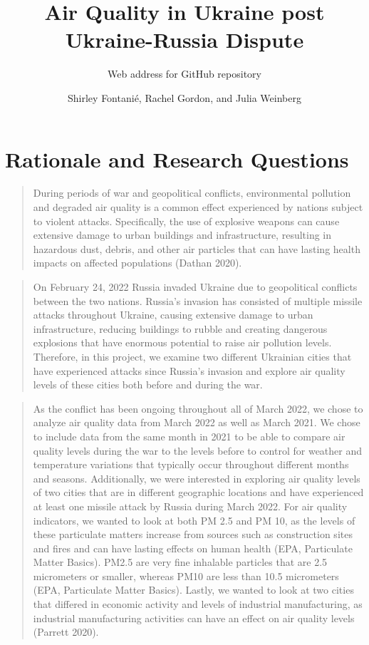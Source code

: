\documentclass[
  12pt,
]{article}
\title{Air Quality in Ukraine post Ukraine-Russia Dispute}
\subtitle{Web address for GitHub repository}
\author{Shirley Fontanié, Rachel Gordon, and Julia Weinberg}
\date{}
\begin{document}
\maketitle

\newpage
\tableofcontents
\newpage
\listoftables 
\newpage 
\listoffigures 
\newpage

\hypertarget{rationale-and-research-questions}{%
\section{Rationale and Research
Questions}\label{rationale-and-research-questions}}

\begin{quote}
During periods of war and geopolitical conflicts, environmental
pollution and degraded air quality is a common effect experienced by
nations subject to violent attacks. Specifically, the use of explosive
weapons can cause extensive damage to urban buildings and
infrastructure, resulting in hazardous dust, debris, and other air
particles that can have lasting health impacts on affected populations
(Dathan 2020).
\end{quote}

\begin{quote}
On February 24, 2022 Russia invaded Ukraine due to geopolitical
conflicts between the two nations. Russia's invasion has consisted of
multiple missile attacks throughout Ukraine, causing extensive damage to
urban infrastructure, reducing buildings to rubble and creating
dangerous explosions that have enormous potential to raise air pollution
levels. Therefore, in this project, we examine two different Ukrainian
cities that have experienced attacks since Russia's invasion and explore
air quality levels of these cities both before and during the war.
\end{quote}

\begin{quote}
As the conflict has been ongoing throughout all of March 2022, we chose
to analyze air quality data from March 2022 as well as March 2021. We
chose to include data from the same month in 2021 to be able to compare
air quality levels during the war to the levels before to control for
weather and temperature variations that typically occur throughout
different months and seasons. Additionally, we were interested in
exploring air quality levels of two cities that are in different
geographic locations and have experienced at least one missile attack by
Russia during March 2022. For air quality indicators, we wanted to look
at both PM 2.5 and PM 10, as the levels of these particulate matters
increase from sources such as construction sites and fires and can have
lasting effects on human health (EPA, Particulate Matter Basics). PM2.5
are very fine inhalable particles that are 2.5 micrometers or smaller,
whereas PM10 are less than 10.5 micrometers (EPA, Particulate Matter
Basics). Lastly, we wanted to look at two cities that differed in
economic activity and levels of industrial manufacturing, as industrial
manufacturing activities can have an effect on air quality levels
(Parrett 2020).
\end{quote}
\end{document}

